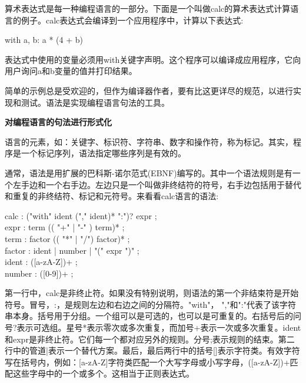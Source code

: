 算术表达式是每一种编程语言的一部分。下面是一个叫做calc的算术表达式计算语言的例子。calc表达式会编译到一个应用程序中，计算以下表达式:\par

\begin{tcolorbox}[colback=white,colframe=black]
with a, b: a * (4 + b)
\end{tcolorbox}

表达式中使用的变量必须用with关键字声明。这个程序可以编译成应用程序，它向用户询问a和b变量的值并打印结果。\par

简单的示例总是受欢迎的，但作为编译器作者，要有比这更详尽的规范，以进行实现和测试。语法是实现编程语言句法的工具。\par

\hspace*{\fill} \par %
\textbf{对编程语言的句法进行形式化}

语言的元素，如：关键字、标识符、字符串、数字和操作符，称为标记。其实，程序是一个标记序列，语法指定哪些序列是有效的。\par

通常，语法是用扩展的巴科斯-诺尔范式(EBNF)编写的。其中一个语法规则是有一个左手边和一个右手边。左边只是一个叫做非终结符的符号，右手边包括用于替代和重复的非终结符、标记和元符号。来看看calc语言的语法:\par

\begin{tcolorbox}[colback=white,colframe=black]
calc : ("with" ident ("," ident)* ":")? expr ; \\
expr : term (( "+" | "-" ) term)* ; \\
term : factor (( "*" | "/") factor)* ; \\
factor : ident | number | "(" expr ")" ; \\
ident : ([a-zA-Z])+ ; \\
number : ([0-9])+ ; 
\end{tcolorbox}

第一行中，calc是非终止符。如果没有特别说明，则语法的第一个非结束符是开始符号。冒号，:，是规则左边和右边之间的分隔符。"with"， ","和":"代表了该字符串本身。括号用于分组。一个组可以是可选的，也可以是可重复的。右括号后的问号?表示可选组。星号*表示零次或多次重复，而加号+表示一次或多次重复。ident和expr是非终止符。它们每一个都对应另外的规则。分号;表示规则的结束。第二行中的管道|表示一个替代方案。最后，最后两行中的括号[]表示字符类。有效字符写在括号内，例如：[a-zA-Z]字符类匹配一个大写字母或小写字母，([a-zA-Z])+匹配这些字母中的一个或多个。这相当于正则表达式。\par

